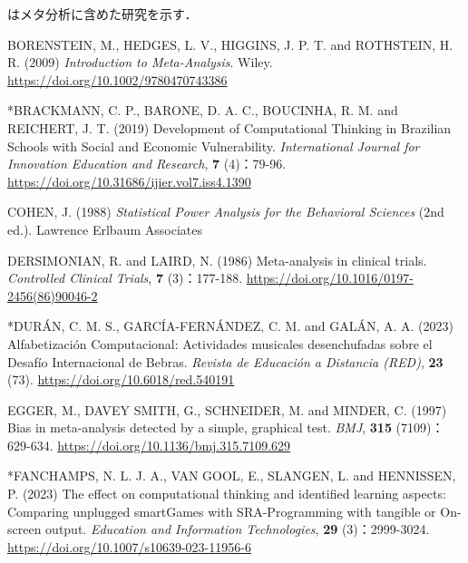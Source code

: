 \documentclass[
  lualatex, ja=standard, paper={182mm,257mm}, twocolumn, fontsize=8.5pt, baselineskip=13.5pt,
  line_length=24zw, column_gap=6.1mm, number_of_lines=45, head_space=24.5mm, gutter=16.25mm
]{jlreq}
\newcommand{\chapspaced}[1]{\par\vspace{13.5pt}\needspace{4\baselineskip}{\centering\gtfamily\bfseries #1\par}\nopagebreak}
\begin{document}
\chapspaced{参考文献}
{\noindent * はメタ分析に含めた研究を示す．\par}
{\small
\par\noindent{}\zw{} BORENSTEIN, M., HEDGES, L. V., HIGGINS, J. P. T. and ROTHSTEIN, H. R. (2009) \textit{Introduction to Meta-Analysis}. Wiley. \url{https://doi.org/10.1002/9780470743386}\par
\par\noindent{}\zw{} *BRACKMANN, C. P., BARONE, D. A. C., BOUCINHA, R. M. and REICHERT, J. T. (2019) Development of Computational Thinking in Brazilian Schools with Social and Economic Vulnerability. \textit{International Journal for Innovation Education and Research}, \textbf{7} (4)：79-96. \url{https://doi.org/10.31686/ijier.vol7.iss4.1390}\par
\par\noindent{}\zw{} COHEN, J. (1988) \textit{Statistical Power Analysis for the Behavioral Sciences} (2nd ed.). Lawrence Erlbaum Associates\par
\par\noindent{}\zw{} DERSIMONIAN, R. and LAIRD, N. (1986) Meta-analysis in clinical trials. \textit{Controlled Clinical Trials}, \textbf{7} (3)：177-188. \url{https://doi.org/10.1016/0197-2456(86)90046-2}\par
\par\noindent{}\zw{} *DURÁN, C. M. S., GARCÍA-FERNÁNDEZ, C. M. and GALÁN, A. A. (2023) Alfabetización Computacional: Actividades musicales desenchufadas sobre el Desafío Internacional de Bebras. \textit{Revista de Educación a Distancia (RED)}, \textbf{23} (73). \url{https://doi.org/10.6018/red.540191}\par
\par\noindent{}\zw{} EGGER, M., DAVEY SMITH, G., SCHNEIDER, M. and MINDER, C. (1997) Bias in meta-analysis detected by a simple, graphical test. \textit{BMJ}, \textbf{315} (7109)：629-634. \url{https://doi.org/10.1136/bmj.315.7109.629}\par
\par\noindent{}\zw{} *FANCHAMPS, N. L. J. A., VAN GOOL, E., SLANGEN, L. and HENNISSEN, P. (2023) The effect on computational thinking and identified learning aspects: Comparing unplugged smartGames with SRA-Programming with tangible or On-screen output. \textit{Education and Information Technologies}, \textbf{29} (3)：2999-3024. \url{https://doi.org/10.1007/s10639-023-11956-6}\par
}
\end{document}
